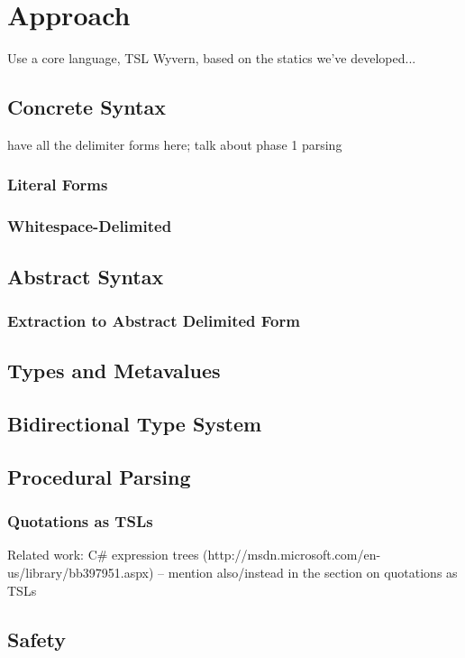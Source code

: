 \section{Approach}
Use a core language, TSL Wyvern, based on the statics we've developed...

\subsection{Concrete Syntax}
have all the delimiter forms here; talk about phase 1 parsing
\label{s:approach}
\subsubsection{Literal Forms}
\subsubsection{Whitespace-Delimited}

\subsection{Abstract Syntax}
\subsubsection{Extraction to Abstract Delimited Form}
\subsection{Types and Metavalues}
\subsection{Bidirectional Type System}
\subsection{Procedural Parsing}
\subsubsection{Quotations as TSLs}
Related work: C\# expression trees (http://msdn.microsoft.com/en-us/library/bb397951.aspx) -- mention also/instead in the section on quotations as TSLs

\subsection{Safety}
